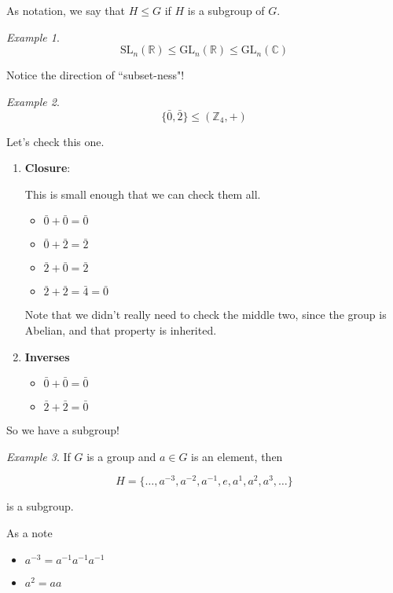 \documentclass[12pt]{article}
\def\gl{\text{GL}}
\def\sl{\text{SL}}
\def\Z{{\mathbb Z}}
\def\R{{\mathbb R}}
\def\C{{\mathbb C}}
\theoremstyle{remark}
\theoremstyle{remark}
\theoremstyle{remark}
\newtheorem{example}{Example}
\theoremstyle{remark}
\theoremstyle{remark}
\begin{document}
As notation, we say that $H \le G$ if $H$ is a subgroup of $G$.

\begin{example}
	\[
		\sl_n(\R) \le \gl_n(\R) \le \gl_n(\C)
	\]

	Notice the direction of ``subset-ness"!
\end{example}

\begin{example}
	\[
		\{\bar 0, \bar 2\} \le (\Z_4, +)
	\]

	Let's check this one.

	\begin{enumerate}
		\item {\bf Closure}:

		      This is small enough that we can check them all.

		      \begin{itemize}
			      \item $\bar 0 + \bar 0 = \bar 0$
			      \item $\bar 0 + \bar 2 = \bar 2$
			      \item $\bar 2 + \bar 0 = \bar 2$
			      \item $\bar 2 + \bar 2 = \bar 4 = \bar 0$
		      \end{itemize}

		      Note that we didn't really need to check the middle two, since the group
		      is Abelian, and that property is inherited.

		\item {\bf Inverses}

		      \begin{itemize}
			      \item $\bar 0 + \bar 0 = \bar 0$
			      \item $\bar 2 + \bar 2 = \bar 0$
		      \end{itemize}
	\end{enumerate}

	So we have a subgroup!
\end{example}

\begin{example}
	If $G$ is a group and $a \in G$ is an element, then

	\[
		H = \{ \dots, a^{-3}, a^{-2}, a^{-1}, e, a^1, a^2, a^3, \dots \}
	\]

	is a subgroup.

	As a note

	\begin{itemize}
		\item $a^{-3} = a^{-1}a^{-1}a^{-1}$
		\item $a^2 = aa$
	\end{itemize}
\end{example}
\end{document}

